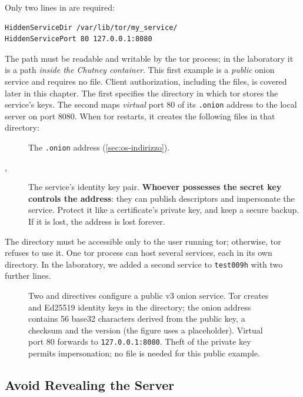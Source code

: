 Only two lines in  are required:
\begin{lstlisting}[language=torrc]
HiddenServiceDir /var/lib/tor/my_service/
HiddenServicePort 80 127.0.0.1:8080
\end{lstlisting}
The  path must be readable and writable by the tor process; in the laboratory it is a path \emph{inside the Chutney container}. This first example is a \emph{public} onion service and requires no  file. Client authorization, including the  files, is covered later in this chapter.
The first specifies the directory in which tor stores the service's keys. The second maps \emph{virtual} port 80 of its \texttt{.onion} address to the local server on port 8080. When tor restarts, it creates the following files in that directory:
\begin{description}
  \item[] The \texttt{.onion} address (\cref{sec:os-indirizzo}).
  \item[, ] The service's identity key pair. \textbf{Whoever possesses the secret key controls the address}: they can publish descriptors and impersonate the service. Protect it like a certificate's private key, and keep a secure backup. If it is lost, the address is lost forever.
\end{description}
The directory must be accessible only to the user running tor; otherwise, tor refuses to use it. One tor process can host several services, each in its own directory. In the laboratory, we added a second service to \texttt{test009h} with two further lines.

\begin{figure}[htbp]
\centering

\caption{Two  and  directives configure a public v3 onion service. Tor creates  and Ed25519 identity keys in the directory; the onion address contains 56 base32 characters derived from the public key, a checksum and the version (the figure uses a placeholder). Virtual port 80 forwards to \texttt{127.0.0.1:8080}. Theft of the private key permits impersonation; no  file is needed for this public example.}
\label{fig:servizio}
\end{figure}

\subsection{Avoid Revealing the Server}

